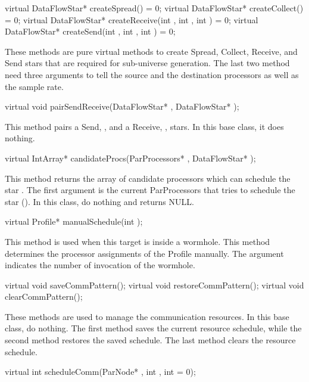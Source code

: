 \begin{example}
virtual DataFlowStar* createSpread() = 0;
virtual DataFlowStar* createCollect() = 0;
virtual DataFlowStar* createReceive(int , int , int ) = 0;
virtual DataFlowStar* createSend(int , int , int ) = 0;
\end{example}

These methods are pure virtual methods to create Spread, Collect, Receive, and
Send stars that are required for sub-universe generation. The last two method
need three arguments to tell the source and the destination processors as well
as the sample rate.

\begin{example}
virtual void pairSendReceive(DataFlowStar* , DataFlowStar* );
\end{example}

This method pairs a Send, , and a Receive, , stars. In this
base class, it does nothing.

\begin{example}
virtual IntArray* candidateProcs(ParProcessors* , DataFlowStar* );
\end{example}

This method returns the array of candidate processors which can schedule
the star . The first argument is the current ParProcessors that tries to
schedule the star (). In this class, do
nothing and returns NULL.

\begin{example}
virtual Profile* manualSchedule(int );
\end{example}

This method is used when this target is inside a wormhole. This method
determines the processor assignments of the Profile manually. The argument
indicates the number of invocation of the wormhole.

\begin{example}
virtual void saveCommPattern();
virtual void restoreCommPattern();
virtual void clearCommPattern();
\end{example}

These methods are used to manage the communication resources. In this base
class, do nothing. The first method saves the current resource schedule,
while the second method restores the saved schedule. The last method clears
the resource schedule.

\begin{example}
virtual int scheduleComm(ParNode* , int , int  = 0);
\end{example}

